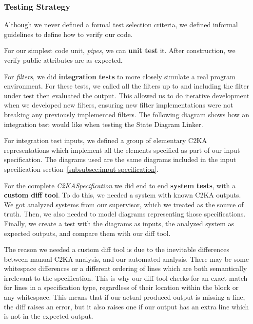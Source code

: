 \newpage
\subsubsection{Testing Strategy}\label{subsubsec:tests-strat}
Although we never defined a formal test selection criteria,
we defined informal guidelines to define how to verify our code.

For our simplest code unit, \textit{pipes}, we can \textbf{unit test} it.
After construction, we verify public attributes are as expected.

For \textit{filters}, we did \textbf{integration tests} to more closely simulate a real program environment.
For these tests, we called all the filters up to and including the filter under test then evaluated the output.
This allowed us to do iterative development when we developed new filters,
ensuring new filter implementations were not breaking any previously implemented filters.
The following diagram shows how an integration test would like when testing the State Diagram Linker.

For integration test inputs, we defined a group of elementary C2KA representations which implement
all the elements specified as part of our input specification.
The diagrams used are the same diagrams included in the input specification section~\ref{subsubsec:input-specification}.

For the complete \textit{C2KASpecification} we did end to end \textbf{system tests}, with a \textbf{custom diff tool}.
To do this, we needed a system with known C2KA outputs.
We got analyzed systems from our supervisor, which we treated as the source of truth.
Then, we also needed to model diagrams representing those specifications.
Finally, we create a test with the diagrams as inputs, the analyzed system as expected outputs,
and compare them with our diff tool.

The reason we needed a custom diff tool is due to the inevitable differences between manual C2KA analysis,
and our automated analysis.
There may be some whitespace differences or a different ordering of lines
which are both semantically irrelevant to the specification.
This is why our diff tool checks for an exact match for lines in a specification type,
regardless of their location within the block or any whitespace.
This means that if our actual produced output is missing a line, the diff raises an error,
but it also raises one if our output has an extra line which is not in the expected output.

